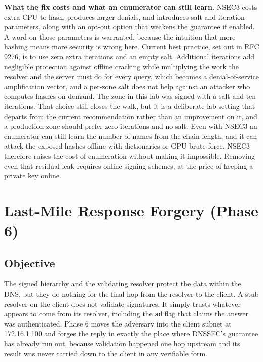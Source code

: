 \documentclass[11pt]{article}
\begin{document}
\textbf{What the fix costs and what an enumerator can still learn.} NSEC3 costs
extra CPU to hash, produces larger denials, and introduces salt and iteration
parameters, along with an opt-out option that weakens the guarantee if enabled. A
word on those parameters is warranted, because the intuition that more hashing means
more security is wrong here. Current best practice, set out in RFC 9276, is to use
zero extra iterations and an empty salt. Additional iterations add negligible
protection against offline cracking while multiplying the work the resolver and the
server must do for every query, which becomes a denial-of-service amplification
vector, and a per-zone salt does not help against an attacker who computes hashes on
demand. The zone in this lab was signed with a salt and ten iterations. That choice
still closes the walk, but it is a deliberate lab setting that departs from the
current recommendation rather than an improvement on it, and a production zone
should prefer zero iterations and no salt. Even with NSEC3 an enumerator can still
learn the number of names from the chain length, and it can attack the exposed
hashes offline with dictionaries or GPU brute force. NSEC3 therefore raises the cost
of enumeration without making it impossible. Removing even that residual leak
requires online signing schemes, at the price of keeping a private key online.


\clearpage

\section{Last-Mile Response Forgery (Phase 6)}

\subsection{Objective}

The signed hierarchy and the validating resolver protect the data within the DNS,
but they do nothing for the final hop from the resolver to the client. A stub
resolver on the client does not validate signatures. It simply trusts whatever
appears to come from its resolver, including the \texttt{ad} flag that claims the
answer was authenticated. Phase 6 moves the adversary into the client subnet at
172.16.1.100 and forges the reply in exactly the place where DNSSEC's guarantee has
already run out, because validation happened one hop upstream and its result was
never carried down to the client in any verifiable form.
\end{document}
